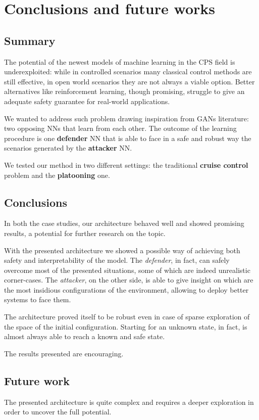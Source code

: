 \chapter{Conclusions and future works}

\section{Summary}
The potential of the newest models of machine learning in the CPS field is underexploited: while in controlled scenarios many classical control methods are still effective, in open world scenarios they are not always a viable option.
Better alternatives like reinforcement learning, though promising, struggle to give an adequate safety guarantee for real-world applications.

We wanted to address such problem drawing inspiration from GANs literature: two opposing NNs that learn from each other.
The outcome of the learning procedure is one \textbf{defender} NN that is able to face in a safe and robust way the scenarios generated by the \textbf{attacker} NN.

We tested our method in two different settings: the traditional \textbf{cruise control} problem and  the \textbf{platooning} one.


\section{Conclusions}
In both the case studies, our architecture behaved well and showed promising results, a potential for further research on the topic.

With the presented architecture we showed a possible way of achieving both safety and interpretability of the model.
The \textit{defender}, in fact, can safely overcome most of the presented situations, some of which are indeed unrealistic corner-cases.
The \textit{attacker}, on the other side, is able to give insight on which are the most insidious configurations of the environment, allowing to deploy better systems to face them.

The architecture proved itself to be robust even in case of sparse exploration of the space of the initial configuration.
Starting for an unknown state, in fact, is almost always able to reach a known and safe state.

The results presented are encouraging.

\section{Future work}
The presented architecture is quite complex and requires a deeper exploration in order to uncover the full potential.

